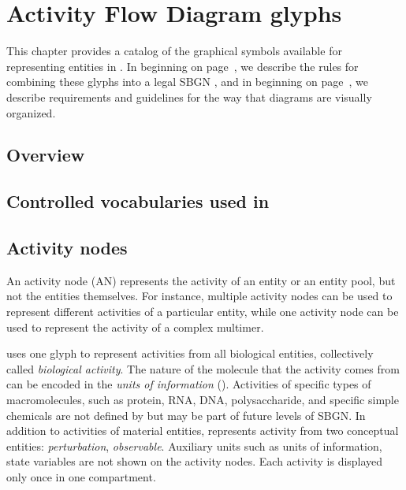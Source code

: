 \chapter{Activity Flow Diagram glyphs}


This chapter provides a catalog of the graphical symbols available for representing entities in \AFs. In  beginning on page~\pageref{chp:af:grammar}, we describe the rules for combining these glyphs into a legal SBGN \AF, and in  beginning on page~\pageref{chp:af:layout}, we describe requirements and guidelines for the way that diagrams are visually organized.

\section{Overview}



\section{Controlled vocabularies used in \SBGNAFLone}\label{af:sec:CVs}




\section{Activity nodes}\label{af:sec:ANs}

An activity node (AN) represents the activity of an entity or an entity pool, but not the entities themselves. For instance, multiple activity nodes can be used to represent different activities of a particular entity, while one activity node can be used to represent the activity of a complex multimer.

\SBGNAFLone uses one glyph to represent activities from all biological entities, collectively called \emph{biological activity}. The nature of the molecule that the activity comes from can be encoded in the \emph{units of information} ().  Activities of specific types of macromolecules, such as protein, RNA, DNA, polysaccharide, and specific simple chemicals are not defined by \SBGNAFLone but may be part of future levels of SBGN. In addition to activities of material entities, \SBGNAFLone represents activity from two conceptual entities: \emph{perturbation}, \emph{observable}.  Auxiliary units such as units of information, state variables are not shown on the activity nodes.  Each activity is displayed only once in one compartment.

